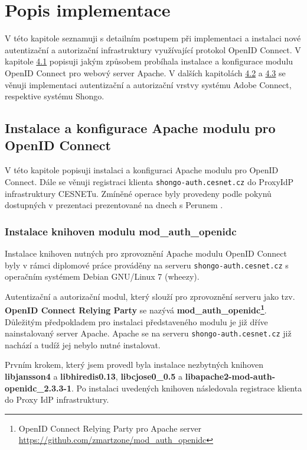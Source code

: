 \documentclass[
  printed, %
  twoside, %
  table,   %
  nolof,     %
  nolot,     %
]{fithesis3}
\begin{document}
\chapter{Popis implementace}
V této kapitole seznamuji s detailním postupem při implementaci a instalaci nové autentizační a autorizační infrastruktury využívající protokol OpenID Connect. V kapitole \hyperref[apacheConfig]{4.1} popisuji jakým způsobem probíhala instalace a konfigurace modulu OpenID Connect pro webový server Apache. V dalších kapitolách \hyperref[ACImpl]{4.2} a \hyperref[ShongoImpl]{4.3} se věnuji implementaci autentizační a autorizační vrstvy systému Adobe Connect, respektive systému Shongo.   


\section{Instalace a konfigurace Apache modulu pro OpenID Connect}
\label{apacheInstall}
V této kapitole popisuji instalaci a konfiguraci Apache modulu pro OpenID Connect. Dále se věnuji registraci klienta \texttt{shongo-auth.cesnet.cz} do ProxyIdP infrastruktury CESNETu. Zmíněné operace byly provedeny podle pokynů dostupných v prezentaci prezentované na dnech s Perunem \cite{oidcConfigPresentation}.

\label{apacheConfig}
\subsection{Instalace knihoven modulu mod\_auth\_openidc}
Instalace knihoven nutných pro zprovoznění Apache modulu OpenID Connect byly v rámci diplomové práce prováděny na serveru \texttt{shongo-auth.cesnet.cz} s operačním systémem Debian GNU/Linux 7 (wheezy). 
\par 
Autentizační a autorizační modul, který slouží pro zprovoznění serveru jako tzv. \textbf{OpenID Connect Relying Party} se nazývá \textbf{mod\_auth\_openidc\footnote{OpenID Connect Relying Party pro Apache server \url{https://github.com/zmartzone/mod\_auth\_openidc}}}. Důležitým předpokladem pro instalaci představeného modulu je již dříve nainstalovaný server Apache. Apache se na serveru \texttt{shongo-auth.cesnet.cz} již nachází a tudíž jej nebylo nutné instalovat. 
\par 
Prvním krokem, který jsem provedl byla instalace nezbytných knihoven \textbf{libjansson4} a \textbf{libhiredis0.13}, \textbf{libcjose0\_0.5} a \textbf{libapache2-mod-auth-openidc\_2.3.3-1}. Po instalaci uvedených knihoven následovala registrace klienta do Proxy IdP infrastruktury. 
\end{document}

